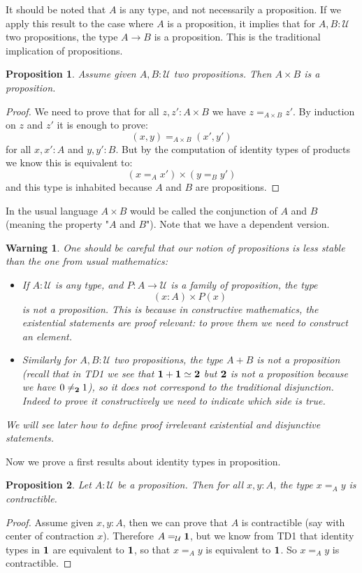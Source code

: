 \documentclass{article}
\newcommand{\U}{{\mathcal U}}
\renewcommand{\r}{\rightarrow}
\newcommand{\one}{{\bf 1}}
\newcommand{\two}{{\bf 2}}
\newtheorem{proposition}{Proposition}
\newtheorem{warning}{\danger Warning}
\begin{document}
It should be noted that $A$ is any type, and not necessarily a proposition. If we apply this result to the case where $A$ is a proposition, it implies that for $A,B:\U$ two propositions, the type $A\r B$ is a proposition. This is the traditional implication of propositions.

\begin{proposition}
Assume given $A,B:\U$ two propositions. Then $A\times B$ is a proposition.
\end{proposition}
\begin{proof}
We need to prove that for all $z,z':A\times B$ we have $z=_{A\times B} z'$. By induction on $z$ and $z'$ it is enough to prove:
\[(x,y)=_{A\times B}(x',y')\]
for all $x,x':A$ and $y,y':B$. But by the computation of identity types of products we know this is equivalent to:
\[(x=_Ax')\times (y=_By')\]
and this type is inhabited because $A$ and $B$ are propositions.
\end{proof}

In the usual language $A\times B$ would be called the conjunction of $A$ and $B$ (meaning the property "$A$ and $B$"). Note that we have a dependent version.

\begin{warning}
One should be careful that our notion of propositions is less stable than the one from usual mathematics:
\begin{itemize}
\item If $A:\U$ is any type, and $P:A\r \U$ is a family of proposition, the type
\[(x:A)\times P(x)\] 
is not a proposition. This is because in constructive mathematics, the existential statements are proof relevant: to prove them we need to construct an element. 
\item Similarly for $A,B:\U$ two propositions, the type $A+B$ is not a proposition (recall that in TD1 we see that $\one+\one\simeq\two$ but $\two$ is not a proposition because we have $0\neq_{\two}1$), so it does not correspond to the traditional disjunction. Indeed to prove it constructively we need to indicate which side is true.  
\end{itemize}
We will see later how to define proof irrelevant existential and disjunctive statements.
\end{warning}

Now we prove a first results about identity types in proposition.

\begin{proposition}
Let $A:\U$ be a proposition. Then for all $x,y:A$, the type $x=_Ay$ is contractible.
\end{proposition}
\begin{proof}
Assume given $x,y:A$, then we can prove that $A$ is contractible (say with center of contraction $x$). Therefore $A=_\U\one$, but we know from TD1 that identity types in $\one$ are equivalent to $\one$, so that $x=_A y$ is equivalent to $\one$. So $x=_Ay$  is contractible.
\end{proof}
\end{document}
